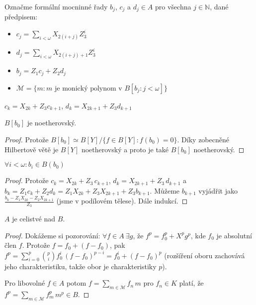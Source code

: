 \documentclass[11pt,a4paper]{article}
\newcommand\m[1]{\mathbb { #1 }} %
\newcommand\p[1]{\mathcal{ #1 }} %
\newcommand\N{\m N}
\theoremstyle{definition}
\theoremstyle{plain}
\begin{document}
 Označme formální mocninné řady $b_j$, $c_j$ a $d_j \in A$ pro všechna
$j \in \N$, dané předpisem:
\begin{itemize}
	\item $c_j = \sum_{i < \omega} X_{2(i + j)} Z^i_3$
	\item $d_j = \sum_{i < \omega} X_{2(i + j) + 1} Z^i_3$
	\item $b_j = Z_1c_j + Z_2d_j$
	\item $\p M = \{ m : m \text{ je monický polynom v } B[b_j : j < \omega] \}$
\end{itemize}

\pozorovani $c_k = X_{2k} + Z_3 c_{k+1}$, $d_k = X_{2k+1} + Z_3 d_{k+1}$

\veta $B[b_0]$ je noetherovský.
\begin{proof}
	 Protože $B[b_0] \simeq B[Y] / \{ f \in B[Y] : f(b_0) = 0 \}$. Díky
	 zobecněné Hilbertově větě je $B[Y]$ noetherovský a proto je také $B[b_0]$
	 noetherovský.
\end{proof}

\lemma $\forall i < \omega\colon b_i \in B(b_0)$
\begin{proof}
	Protože $c_k = X_{2k} + Z_3\,c_{k+1}$, $d_k = X_{2k+1} + Z_3\,d_{k+1}$ a $b_k
	= Z_1 c_k + Z_2 d_k = Z_1 X_{2k} + Z_3 X_{2k + 1} + Z_3 b_{k + 1}$. Můžeme
	$b_{k+1}$ vyjádřit jako $\frac{b_k - Z_1 X_{2k} - Z_2 X_{2k+1}}{Z_3}$ (jsme
	v podílovém tělese). Dále indukcí.
\end{proof}

\lemma\label{celistvostA} $A$ je celistvé nad $B$.
\begin{proof}
	Dokážeme si pozorování: $\forall f \in A~\exists g$, že $f^p = f^p_0 + X^p
	g^p$, kde $f_0$ je absolutní člen $f$. Protože $f = f_0 + (f - f_0)$, pak
	$f^p = \sum_{i = 0}^p {p\choose i} f^i_0\,(f-f_0)^{p-i} = f^i_0 + (f-f_0)^p$
	(rozšíření oboru zachovává jeho charakteristiku, takže obor je
	charakteristiky $p$).

	Pro libovolné $f \in A$ potom $f = \sum_{m \in \p M} f_n\,m$ pro $f_n \in
	K$ platí, že $f^p = \sum_{m\in\p M} f^p_m\,m^p \in B$.
\end{proof}
\end{document}
